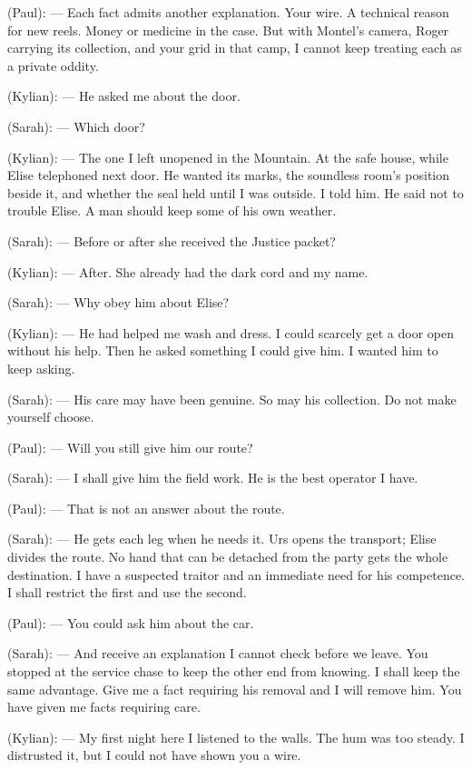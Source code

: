 \begin{room}
(Paul): --- Each fact admits another explanation. Your wire. A technical reason for new reels. Money or medicine in the case. But with Montel's camera, Roger carrying its collection, and your grid in that camp, I cannot keep treating each as a private oddity.

(Kylian): --- He asked me about the door.

(Sarah): --- Which door?

(Kylian): --- The one I left unopened in the Mountain. At the safe house, while Elise telephoned next door. He wanted its marks, the soundless room's position beside it, and whether the seal held until I was outside. I told him. He said not to trouble Elise. A man should keep some of his own weather.

(Sarah): --- Before or after she received the Justice packet?

(Kylian): --- After. She already had the dark cord and my name.

(Sarah): --- Why obey him about Elise?

(Kylian): --- He had helped me wash and dress. I could scarcely get a door open without his help. Then he asked something I could give him. I wanted him to keep asking.

(Sarah): --- His care may have been genuine. So may his collection. Do not make yourself choose.

(Paul): --- Will you still give him our route?

(Sarah): --- I shall give him the field work. He is the best operator I have.

(Paul): --- That is not an answer about the route.

(Sarah): --- He gets each leg when he needs it. Urs opens the transport; Elise divides the route. No hand that can be detached from the party gets the whole destination. I have a suspected traitor and an immediate need for his competence. I shall restrict the first and use the second.

(Paul): --- You could ask him about the car.

(Sarah): --- And receive an explanation I cannot check before we leave. You stopped at the service chase to keep the other end from knowing. I shall keep the same advantage. Give me a fact requiring his removal and I will remove him. You have given me facts requiring care.

(Kylian): --- My first night here I listened to the walls. The hum was too steady. I distrusted it, but I could not have shown you a wire.


\end{room}
